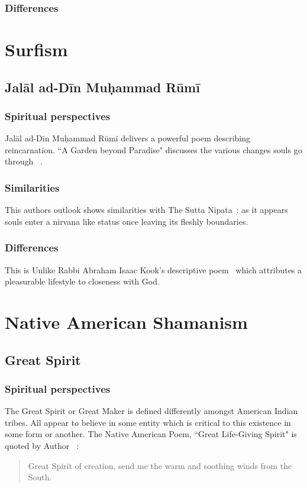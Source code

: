 \documentclass[11pt,a4paper]{scrartcl} %
\begin{document}
     \subsubsection{Differences}
    \section{Surfism}
    \subsection{Jal\={a}l ad-D\={i}n Muḥammad R\={u}m\={i} }
\subsubsection{Spiritual perspectives}
Jal\={a}l ad-D\={i}n Muḥammad R\={u}m\={i} delivers a powerful poem describing reincarnation. ``A Garden beyond Paradise" discusses the various changes souls go through ~\citealp[pg. 246-247]{eknath}.
     \subsubsection{Similarities}
    This authors outlook shows similarities with The Sutta Nipata~\citealp[pg. 200]{eknath}: as it appears souls enter a nirvana like status once leaving its fleshly boundaries. 
     \subsubsection{Differences}
   This is Unlike Rabbi Abraham Isaac Kook's descriptive poem~\citealp[pg. 39]{eknath} which attributes a pleasurable lifestyle to closeness with God.
     \section{Native American Shamanism}
     \subsection{Great Spirit}
     \subsubsection{Spiritual perspectives}
     The Great Spirit or Great Maker is defined differently amongst American Indian tribes. All appear to believe in some entity which is critical to this existence in some form or another. The Native American Poem, ``Great Life-Giving Spirit" is quoted by Author ~\citealp[pg. 186]{eknath}:
\begin{quote}
 Great Spirit of creation, send me the warm and soothing winds from the South.
\end{quote}
\end{document}
